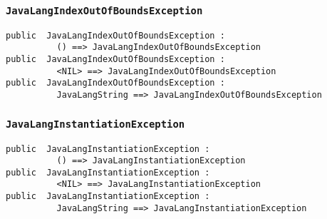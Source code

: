 \documentclass[\pformat,12pt]{article}
\begin{document}
\subsubsection{\texttt{JavaLangIndexOutOfBoundsException}}
\begin{small}
\begin{verbatim}
public  JavaLangIndexOutOfBoundsException : 
          () ==> JavaLangIndexOutOfBoundsException
public  JavaLangIndexOutOfBoundsException : 
          <NIL> ==> JavaLangIndexOutOfBoundsException
public  JavaLangIndexOutOfBoundsException : 
          JavaLangString ==> JavaLangIndexOutOfBoundsException
\end{verbatim}
\end{small}

\subsubsection{\texttt{JavaLangInstantiationException}}
\begin{small}
\begin{verbatim}
public  JavaLangInstantiationException : 
          () ==> JavaLangInstantiationException
public  JavaLangInstantiationException : 
          <NIL> ==> JavaLangInstantiationException
public  JavaLangInstantiationException : 
          JavaLangString ==> JavaLangInstantiationException
\end{verbatim}
\end{small}
\end{document}
